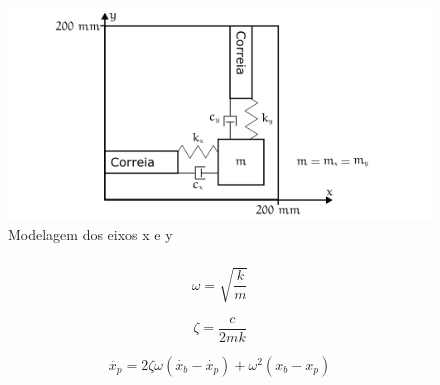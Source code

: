 \documentclass[aspectratio=169]{beamer}
\begin{document}
\begin{frame}
  \frametitle{\insertsubsection}
  \begin{figure}[H]
    \centering
    \caption{Modelagem dos eixos x e y}
    \includegraphics[scale=0.4]{model_2_axis}

    \label{fig:model_2_axis}
  \end{figure}
\end{frame}

\begin{frame}
  \frametitle{\insertsubsection}
  
  \begin{equation}
    \label{eq:freq_nat}
    \omega = \sqrt{\frac{k}{m}}
  \end{equation}
  
  \begin{equation}
    \label{eq:amort}
    \zeta = \frac{c}{2mk}
  \end{equation}
  
  \begin{equation}
    \label{eq:equation_simpl}
    \ddot{x_p} = 2 \zeta \omega(\dot{x_b} - \dot{x_p}) + \omega ^2(x_b - x_p)
  \end{equation}
\end{frame}
\end{document}
